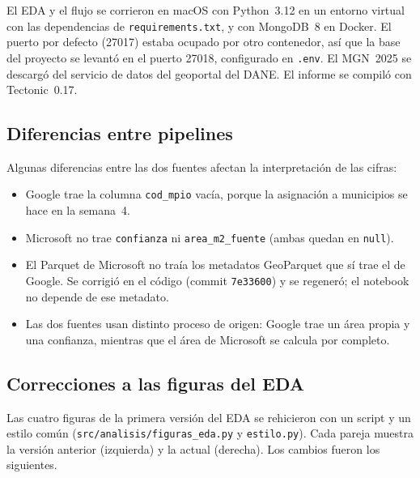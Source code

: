 \documentclass[11pt,a4paper]{article}
\newcommand{\campo}[1]{\texttt{#1}}
\begin{document}
El EDA y el flujo se corrieron en macOS con Python~3.12 en un entorno virtual con
las dependencias de \campo{requirements.txt}, y con MongoDB~8 en Docker. El puerto
por defecto (27017) estaba ocupado por otro contenedor, así que la base del
proyecto se levantó en el puerto 27018, configurado en \campo{.env}. El MGN~2025
se descargó del servicio de datos del geoportal del DANE. El informe se compiló con
Tectonic~0.17.

\subsection{Diferencias entre pipelines}

Algunas diferencias entre las dos fuentes afectan la interpretación de las cifras:

\begin{itemize}
  \item Google trae la columna \campo{cod\_mpio} vacía, porque la asignación a
        municipios se hace en la semana~4.
  \item Microsoft no trae \campo{confianza} ni \campo{area\_m2\_fuente} (ambas quedan
        en \campo{null}).
  \item El Parquet de Microsoft no traía los metadatos GeoParquet que sí trae el de
        Google. Se corrigió en el código (commit \texttt{7e33600}) y se regeneró;
        el notebook no depende de ese metadato.
  \item Las dos fuentes usan distinto proceso de origen: Google trae un área propia
        y una confianza, mientras que el área de Microsoft se calcula por completo.
\end{itemize}

\subsection{Correcciones a las figuras del EDA}
\label{sec:eda-correcciones}

Las cuatro figuras de la primera versión del EDA se rehicieron con un script y
un estilo común (\campo{src/analisis/figuras\_eda.py} y \campo{estilo.py}). Cada
pareja muestra la versión anterior (izquierda) y la actual (derecha). Los cambios
fueron los siguientes.
\end{document}
